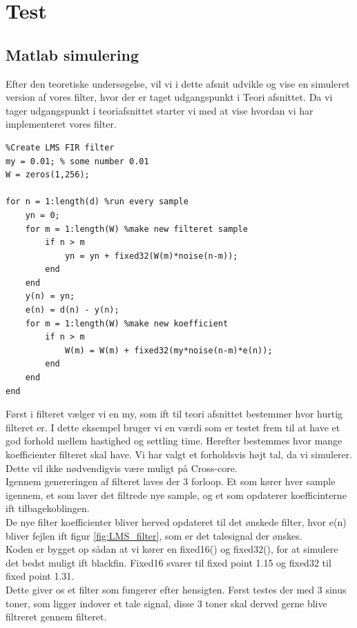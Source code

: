 \graphicspath{{Chapters/Test/}}


\section{Test}

\subsection{Matlab simulering}

Efter den teoretiske undersøgelse, vil vi i dette afsnit udvikle og vise en simuleret version af vores filter, hvor der er taget udgangspunkt i Teori afsnittet. Da vi tager udgangspunkt i teoriafsnittet starter vi med at vise hvordan vi har implementeret vores filter. 

\begin{lstlisting}
%Create LMS FIR filter
my = 0.01; % some number 0.01
W = zeros(1,256);

for n = 1:length(d) %run every sample 
    yn = 0;
    for m = 1:length(W) %make new filteret sample 
        if n > m
            yn = yn + fixed32(W(m)*noise(n-m));
        end
    end
    y(n) = yn;
    e(n) = d(n) - y(n);
    for m = 1:length(W) %make new koefficient  
        if n > m
            W(m) = W(m) + fixed32(my*noise(n-m)*e(n));
        end
    end
end
\end{lstlisting}

Først i filteret vælger vi en my, som ift til teori afsnittet bestemmer hvor hurtig filteret er. I dette eksempel bruger vi en værdi som er testet frem til at have et god forhold mellem hastighed og settling time. Herefter bestemmes hvor mange koefficienter filteret skal have. Vi har valgt et forholdsvis højt tal, da vi simulerer. Dette vil ikke nødvendigvis være muligt på Cross-core. \\

Igennem genereringen af filteret laves der 3 forloop. Et som kører hver sample igennem, et som laver det filtrede nye sample, og et som opdaterer koefficinterne ift tilbagekoblingen. \\
De nye filter koefficienter bliver herved opdateret til det ønskede filter, hvor e(n) bliver fejlen ift figur \ref{fig:LMS_filter}, som er det talesignal der ønskes. \\
Koden er bygget op sådan at vi kører en fixed16() og fixed32(), for at simulere det bedst muligt ift blackfin. Fixed16 svarer til fixed point 1.15 og fixed32 til fixed point 1.31. 
\\
Dette giver os et filter som fungerer efter hensigten. Først testes der med 3 sinus toner, som ligger indover et tale signal, disse 3 toner skal derved gerne blive filtreret gennem filteret.

